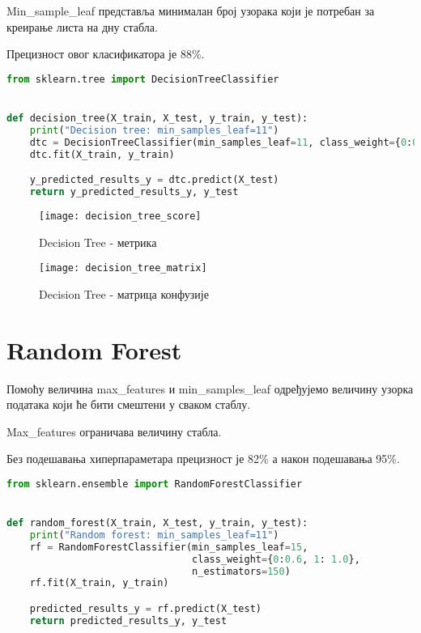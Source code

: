 \documentclass[11pt]{article} %
\begin{document}
Min\_sample\_leaf представља минималан број узорака који је потребан за креирање листа на дну стабла.

Прецизност овог класификатора је 88\%.

\begin{lstlisting}[language=Python,title=Пример 5. ]
from sklearn.tree import DecisionTreeClassifier


def decision_tree(X_train, X_test, y_train, y_test):
    print("Decision tree: min_samples_leaf=11")
    dtc = DecisionTreeClassifier(min_samples_leaf=11, class_weight={0:0.8, 1: 1.0})
    dtc.fit(X_train, y_train)

    y_predicted_results_y = dtc.predict(X_test)
    return y_predicted_results_y, y_test
\end{lstlisting}

\begin{figure}[h]
\centering
	\texttt{[image: decision\_tree\_score]} 
	\caption{Decision Tree - метрика} 
\end{figure}

\newpage


\begin{figure}[h]
\centering
	\texttt{[image: decision\_tree\_matrix]} 
	\caption{Decision Tree - матрица конфузије} 
\end{figure}


\section{Random Forest}
Помоћу величина max\_features и min\_samples\_leaf одређујемо величину узорка података који ће бити смештени у сваком стаблу.

Max\_features ограничава величину стабла.

Без подешавања хиперпараметара прецизност је 82\% а након подешавања 95\%.

\begin{lstlisting}[language=Python,title=Пример 6. Random forest код]
from sklearn.ensemble import RandomForestClassifier


def random_forest(X_train, X_test, y_train, y_test):
    print("Random forest: min_samples_leaf=11")
    rf = RandomForestClassifier(min_samples_leaf=15,
                                class_weight={0:0.6, 1: 1.0},
                                n_estimators=150)
    rf.fit(X_train, y_train)

    predicted_results_y = rf.predict(X_test)
    return predicted_results_y, y_test


\end{lstlisting}
\end{document}
